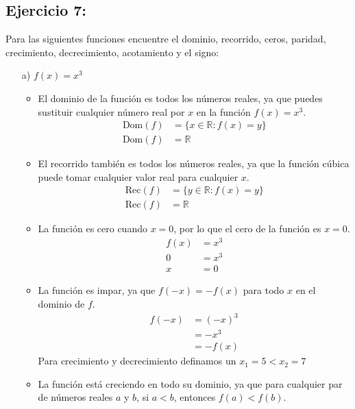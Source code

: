 \documentclass{templateNote}
\begin{document}
\subsection*{\textbf{Ejercicio 7:}}
Para las siguientes funciones encuentre el dominio, recorrido, ceros, paridad,
crecimiento, decrecimiento, acotamiento y el signo:

\begin{itemize}
    \item[a)] $f(x) = x^3$
        \begin{itemize}
            \item {} El dominio de la función es todos los números reales, ya que puedes sustituir cualquier número real por $x$ en la función $f(x) = x^3$.
                \begin{align*}
                    \text{Dom}(f) &= \{x \in \mathbb{R} : f(x) = y\} \\
                    \text{Dom}(f) &= \mathbb{R}    
                \end{align*}
            \item {} El recorrido también es todos los números reales, ya que la función cúbica puede tomar cualquier valor real para cualquier $x$.
                \begin{align*}
                    \text{Rec}(f) &= \{y \in \mathbb{R} : f(x) = y\} \\
                    \text{Rec}(f) &= \mathbb{R}
                \end{align*}
            \item {} La función es cero cuando $x = 0$, por lo que el cero de la función es $x = 0$.
                \begin{align*}
                    f(x) &= x^3 \\
                    0 &= x^3 \\
                    x &= 0
                \end{align*}
            \item {} La función es impar, ya que $f(-x) = -f(x)$ para todo $x$ en el dominio de $f$.
                \begin{align*}
                    f(-x) &= (-x)^3 \\
                    &= -x^3 \\
                    &= -f(x)
                \end{align*}
            Para crecimiento y decrecimiento definamos un $x_{1}=5 < x_2=7$
            \item {} La función está creciendo en todo su dominio, ya que para cualquier par de números reales $a$ y $b$, si $a < b$, entonces $f(a) < f(b)$.

\end{itemize}
\end{itemize}
\end{document}
